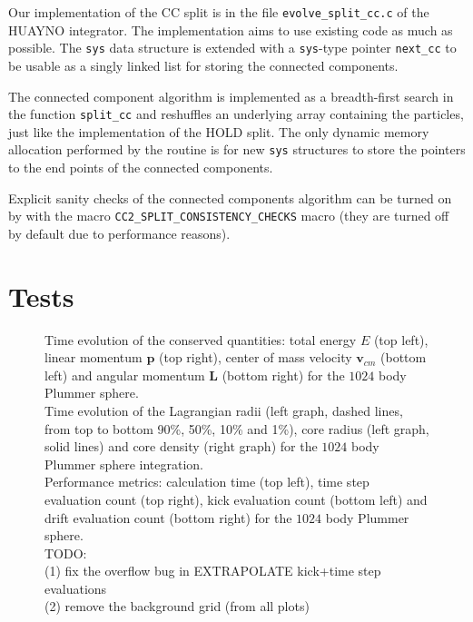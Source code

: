 \documentclass[referee]{aa}
\begin{document}
Our implementation of the CC split is in the file \texttt{evolve\_split\_cc.c}
of the HUAYNO integrator. The implementation aims to use existing
code as much as possible. The \texttt{sys} data structure is extended
with a \texttt{sys}-type pointer \texttt{next\_cc} to be usable as
a singly linked list for storing the connected components.

The connected component algorithm is implemented as a breadth-first
search in the function \texttt{split\_cc} and reshuffles an underlying
array containing the particles, just like the implementation of the
HOLD split. The only dynamic memory allocation performed by the routine
is for new \texttt{sys} structures to store the pointers to the end
points of the connected components.

Explicit sanity checks of the connected components algorithm can be
turned on by with the macro \texttt{CC2\_SPLIT\_CONSISTENCY\_CHECKS}
macro (they are turned off by default due to performance reasons).


\section{Tests}

\begin{figure}[p]
\begin{centering}
\par\end{centering}

\caption{\label{fig:plummer-unsoftened}Time evolution of the conserved quantities:
total energy $E$ (top left), linear momentum $\mathbf{p}$ (top right),
center of mass velocity $\mathbf{v}_{cm}$ (bottom left) and angular
momentum $\mathbf{L}$ (bottom right) for the $1024$ body Plummer
sphere.\protect \\
Time evolution of the Lagrangian radii (left graph, dashed lines,
from top to bottom 90\%, 50\%, 10\% and 1\%), core radius (left graph,
solid lines) and core density (right graph) for the $1024$ body Plummer
sphere integration.\protect \\
Performance metrics: calculation time (top left), time step evaluation
count (top right), kick evaluation count (bottom left) and drift evaluation
count (bottom right) for the $1024$ body Plummer sphere.\protect \\
TODO: \protect \\
(1) fix the overflow bug in EXTRAPOLATE kick+time step evaluations\protect \\
(2) remove the background grid (from all plots)}
\end{figure}
\end{document}
